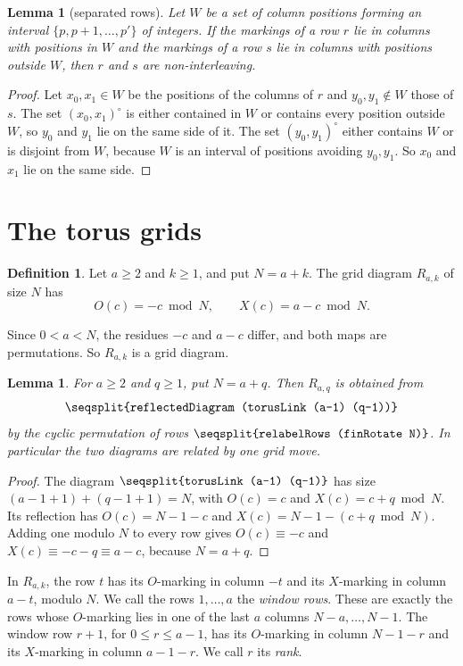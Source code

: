 \documentclass[11pt]{amsart}
\newtheorem{lemma}[theorem]{Lemma}
\theoremstyle{definition}
\newtheorem{definition}[theorem]{Definition}
\theoremstyle{remark}
\newcommand{\lean}[1]{\texttt{\seqsplit{#1}}}
\begin{document}
\begin{lemma}[separated rows]\label{lem:separated}
Let $W$ be a set of column positions forming an interval $\{p,p+1,\dots,p'\}$ of integers. If the
markings of a row $r$ lie in columns with positions in $W$ and the markings of a row $s$ lie in
columns with positions outside $W$, then $r$ and $s$ are non-interleaving.
\end{lemma}

\begin{proof}
Let $x_0,x_1\in W$ be the positions of the columns of $r$ and $y_0,y_1\notin W$ those of $s$. The
set $(x_0,x_1)^\circ$ is either contained in $W$ or contains every position outside $W$, so $y_0$ and
$y_1$ lie on the same side of it. The set $(y_0,y_1)^\circ$ either contains $W$ or is disjoint from $W$,
because $W$ is an interval of positions avoiding $y_0,y_1$. So $x_0$ and $x_1$ lie on the same side.
\end{proof}

\section{The torus grids}\label{sec:torus}

\begin{definition}\label{def:R}
Let $a\ge2$ and $k\ge1$, and put $N=a+k$. The grid diagram $R_{a,k}$ of size $N$ has
\[
O(c)=-c\bmod N,\qquad X(c)=a-c\bmod N.
\]
\end{definition}

Since $0<a<N$, the residues $-c$ and $a-c$ differ, and both maps are permutations. So
$R_{a,k}$ is a grid diagram.

\begin{lemma}\label{lem:R-reflect}
For $a\ge2$ and $q\ge1$, put $N=a+q$. Then $R_{a,q}$ is obtained from
\[
\lean{reflectedDiagram (torusLink (a-1) (q-1))}
\]
by the cyclic permutation of rows
$\lean{relabelRows (finRotate N)}$. In particular the two diagrams are related by one grid move.
\end{lemma}

\begin{proof}
The diagram $\lean{torusLink (a-1) (q-1)}$ has size $(a-1+1)+(q-1+1)=N$, with $O(c)=c$ and
$X(c)=c+q\bmod N$. Its reflection has $O(c)=N-1-c$ and $X(c)=N-1-(c+q\bmod N)$. Adding one modulo
$N$ to every row gives $O(c)\equiv -c$ and $X(c)\equiv -c-q\equiv a-c$, because $N=a+q$.
\end{proof}

In $R_{a,k}$, the row $t$ has its $O$-marking in column $-t$ and its $X$-marking in column $a-t$,
modulo $N$. We call the rows $1,\dots,a$ the \emph{window rows}. These are exactly the rows whose
$O$-marking lies in one of the last $a$ columns $N-a,\dots,N-1$. The window row $r+1$, for
$0\le r\le a-1$, has its $O$-marking in column $N-1-r$ and its $X$-marking in column $a-1-r$.
We call $r$ its \emph{rank}.
\end{document}
